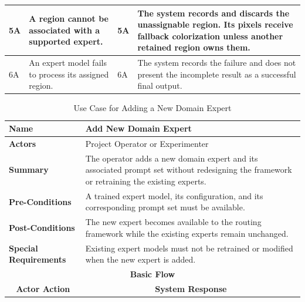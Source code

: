 \documentclass{FastFyp}
\begin{document}
\begin{longtable}{|p{0.7cm}|p{2.7cm}|p{3.5cm}|p{0.8cm}|p{5.7cm}|}
5A &
\multicolumn{2}{p{6.2cm}|}{
A region cannot be associated with a supported expert.
} &
5A &
The system records and discards the unassignable region. Its pixels receive fallback colorization unless another retained region owns them. \\ \hline

6A &
\multicolumn{2}{p{6.2cm}|}{
An expert model fails to process its assigned region.
} &
6A &
The system records the failure and does not present the incomplete result as a successful final output. \\ \hline

\end{longtable}


\begin{longtable}{|p{0.7cm}|p{2.7cm}|p{3.5cm}|p{0.8cm}|p{5.7cm}|}
\caption{Use Case for Adding a New Domain Expert}
\label{tab:uc-add-expert}\\
\hline

\multicolumn{2}{|l|}{\textbf{Name}} &
\multicolumn{3}{p{10.4cm}|}{Add New Domain Expert} \\ \hline

\multicolumn{2}{|l|}{\textbf{Actors}} &
\multicolumn{3}{p{10.4cm}|}{Project Operator or Experimenter} \\ \hline

\multicolumn{2}{|l|}{\textbf{Summary}} &
\multicolumn{3}{p{10.4cm}|}{
The operator adds a new domain expert and its associated prompt set without redesigning the framework or retraining the existing experts.
} \\ \hline

\multicolumn{2}{|l|}{\textbf{Pre-Conditions}} &
\multicolumn{3}{p{10.4cm}|}{
A trained expert model, its configuration, and its corresponding prompt set must be available.
} \\ \hline

\multicolumn{2}{|l|}{\textbf{Post-Conditions}} &
\multicolumn{3}{p{10.4cm}|}{
The new expert becomes available to the routing framework while the existing experts remain unchanged.
} \\ \hline

\multicolumn{2}{|l|}{\textbf{Special Requirements}} &
\multicolumn{3}{p{10.4cm}|}{
Existing expert models must not be retrained or modified when the new expert is added.
} \\ \hline

\multicolumn{5}{|c|}{\textbf{Basic Flow}} \\ \hline

\multicolumn{3}{|c|}{\textbf{Actor Action}} &
\multicolumn{2}{c|}{\textbf{System Response}} \\ \hline


\end{longtable}
\end{document}
